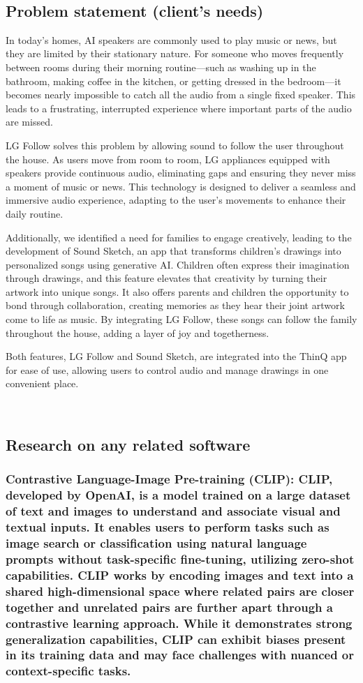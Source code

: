 \documentclass[conference]{IEEEtran}
\begin{document}
\
\
\
\subsection{Problem statement (client’s needs)}

In today’s homes, AI speakers are commonly used to play music or news, but they are limited by their stationary nature. For someone who moves frequently between rooms during their morning routine—such as washing up in the bathroom, making coffee in the kitchen, or getting dressed in the bedroom—it becomes nearly impossible to catch all the audio from a single fixed speaker. This leads to a frustrating, interrupted experience where important parts of the audio are missed.

LG Follow solves this problem by allowing sound to follow the user throughout the house. As users move from room to room, LG appliances equipped with speakers provide continuous audio, eliminating gaps and ensuring they never miss a moment of music or news. This technology is designed to deliver a seamless and immersive audio experience, adapting to the user's movements to enhance their daily routine.

Additionally, we identified a need for families to engage creatively, leading to the development of Sound Sketch, an app that transforms children's drawings into personalized songs using generative AI. Children often express their imagination through drawings, and this feature elevates that creativity by turning their artwork into unique songs. It also offers parents and children the opportunity to bond through collaboration, creating memories as they hear their joint artwork come to life as music. By integrating LG Follow, these songs can follow the family throughout the house, adding a layer of joy and togetherness.

Both features, LG Follow and Sound Sketch, are integrated into the ThinQ app for ease of use, allowing users to control audio and manage drawings in one convenient place.  

\ 
\subsection{Research on any related software}

\subsubsection{Contrastive Language-Image Pre-training (CLIP): CLIP, developed by OpenAI, is a model trained on a large dataset of text and images to understand and associate visual and textual inputs. It enables users to perform tasks such as image search or classification using natural language prompts without task-specific fine-tuning, utilizing zero-shot capabilities. CLIP works by encoding images and text into a shared high-dimensional space where related pairs are closer together and unrelated pairs are further apart through a contrastive learning approach. While it demonstrates strong generalization capabilities, CLIP can exhibit biases present in its training data and may face challenges with nuanced or context-specific tasks.}
\
\end{document}

